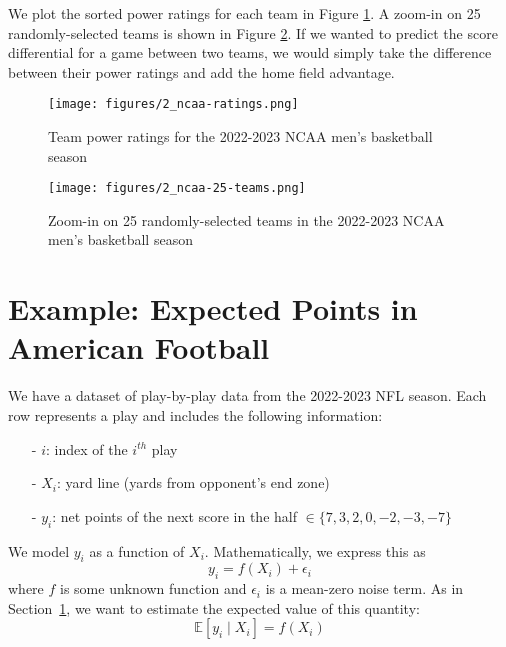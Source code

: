 \documentclass[twoside]{article}
\theoremstyle{definition}
\begin{document}
We plot the sorted power ratings for each team in Figure \ref{fig:ncaa-ratings}. A zoom-in on 25 randomly-selected teams is shown in Figure \ref{fig:ncaa-25-teams}. If we wanted to predict the score differential for a game between two teams, we would simply take the difference between their power ratings and add the home field advantage.
\begin{figure}[H]
    \centering
    \texttt{[image: figures/2\_ncaa-ratings.png]}
    \caption{Team power ratings for the 2022-2023 NCAA men's basketball season}
    \label{fig:ncaa-ratings}
\end{figure}
\begin{figure}[H]
    \centering
    \texttt{[image: figures/2\_ncaa-25-teams.png]}
    \caption{Zoom-in on 25 randomly-selected teams in the 2022-2023 NCAA men's basketball season}
    \label{fig:ncaa-25-teams}
\end{figure}

\section{Example: Expected Points in American Football}
\label{sec:expected-points}

We have a dataset of play-by-play data from the 2022-2023 NFL season. Each row represents a play and includes the following information:
\begin{itemize}
    \item[-] $i$: index of the $i^{th}$ play
    \item[-] $X_i$: yard line (yards from opponent's end zone)
    \item[-] $y_i$: net points of the next score in the half $\in \{7, 3, 2, 0, -2, -3, -7\}$
\end{itemize}
We model $y_i$ as a function of $X_i$. Mathematically, we express this as
\begin{equation}
    y_i = f(X_i) + \epsilon_i
\end{equation}
where $f$ is some unknown function and $\epsilon_i$ is a mean-zero noise term. As in Section~\ref{sec:expected-points}, we want to estimate the expected value of this quantity:
\begin{equation}
    \mathbb{E}[y_i \mid X_i] = f(X_i)
\end{equation}
\end{document}
